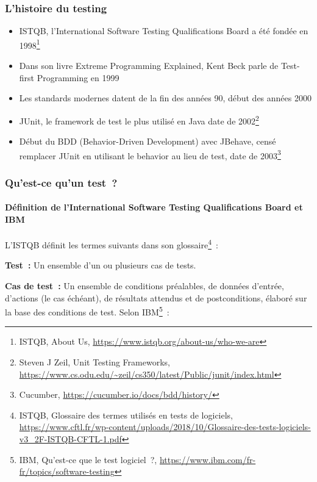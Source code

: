 \documentclass{beamer}
\begin{document}
    \begin{frame}
        \transdissolve
        \frametitle{L'histoire du testing}

        \begin{itemize}

            \item ISTQB, l'International Software Testing Qualifications Board a été fondée en 1998\footnote{ISTQB, About Us, \url{https://www.istqb.org/about-us/who-we-are}}
            \item Dans son livre Extreme Programming Explained, Kent Beck parle de Test-first Programming en 1999
            \item Les standards modernes datent de la fin des années 90, début des années 2000
            \item JUnit, le framework de test le plus utilisé en Java date de 2002\footnote{Steven J Zeil, Unit Testing Frameworks, \url{https://www.cs.odu.edu/~zeil/cs350/latest/Public/junit/index.html}}
            \item Début du BDD (Behavior-Driven Development) avec JBehave, censé remplacer JUnit en utilisant le behavior au lieu de test, date de 2003\footnote{Cucumber, \url{https://cucumber.io/docs/bdd/history/}}
        \end{itemize}

    \end{frame}

    \begin{frame}
        \frametitle{Qu’est-ce qu’un test~?}
        \framesubtitle{Définition de l'International Software Testing Qualifications Board et IBM}
        \transdissolve
        L’ISTQB définit les termes suivants dans son glossaire\footnote{ISTQB, Glossaire des termes utilisés en tests de logiciels, \url{https://www.cftl.fr/wp-content/uploads/2018/10/Glossaire-des-tests-logiciels-v3_2F-ISTQB-CFTL-1.pdf}}~:

        \textbf{Test~:} Un ensemble d’un ou plusieurs cas
        de tests.

        \textbf{Cas de test~:} Un ensemble de conditions
        préalables, de données d'entrée, d'actions
        (le cas échéant), de résultats attendus et
        de postconditions, élaboré sur la base des
        conditions de test.
        \bigbreak
        Selon IBM\footnote{IBM, Qu'est-ce que le test logiciel~?, \url{https://www.ibm.com/fr-fr/topics/software-testing}}~:

    \end{frame}
\end{document}
